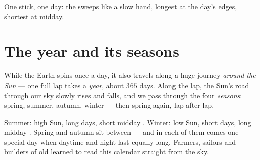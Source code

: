 \begin{omfigure}

{\small One stick, one day: the  sweeps like a slow hand,
longest at the day's edges, shortest at midday.}
\end{omfigure}

\section{The year and its seasons}

\begin{definition}\label{def:g3:sun-days-seasons:year}
While the Earth spins once a day, it also travels along a huge
journey \emph{around the Sun} --- one full lap takes a
\emph{year}, about $365$ days. Along the lap, the Sun's
road through our sky slowly rises and falls, and we pass through the
four \emph{seasons}: spring, summer, autumn, winter
--- then spring again, lap after lap.
\end{definition}

\begin{example}\label{ex:g3:sun-days-seasons:quarters}
Summer: high Sun, long days, short midday . Winter: low Sun,
short days, long midday . Spring and autumn sit between ---
and in each of them comes one special day when daytime and night
last equally long. Farmers, sailors and builders of old learned to
read this calendar straight from the sky.
\end{example}

